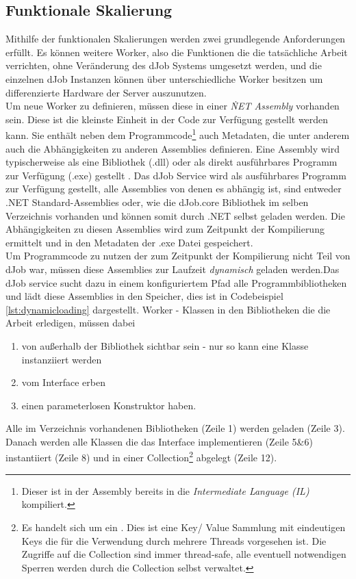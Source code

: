 \subsection{Funktionale Skalierung} \label{sec:dynload}
Mithilfe der funktionalen Skalierungen werden zwei grundlegende Anforderungen erfüllt. Es können weitere Worker, also die Funktionen die die tatsächliche Arbeit verrichten, ohne Veränderung des dJob Systems umgesetzt werden, und die einzelnen dJob Instanzen können über unterschiedliche Worker besitzen um differenzierte Hardware der Server auszunutzen.
\\Um neue Worker zu definieren, müssen diese in einer \emph{\.NET Assembly} vorhanden sein. 
Diese ist die kleinste Einheit in der Code zur Verfügung gestellt werden kann. Sie enthält neben dem Programmcode\footnote{Dieser ist in der Assembly bereits in die \emph{Intermediate Language (IL)} kompiliert.} auch Metadaten, die unter anderem auch die Abhängigkeiten zu anderen Assemblies definieren. Eine Assembly wird typischerweise als eine Bibliothek (.dll) oder als direkt ausführbares Programm zur Verfügung (.exe) gestellt \parencite[S. 17ff]{box}. Das dJob Service wird als ausführbares Programm zur Verfügung gestellt, alle Assemblies von denen es abhängig ist, sind entweder .NET Standard-Assemblies oder, wie die dJob.core Bibliothek im selben Verzeichnis vorhanden und können somit durch .NET selbst geladen werden. Die Abhängigkeiten zu diesen Assemblies wird zum Zeitpunkt der Kompilierung ermittelt und in den Metadaten der .exe Datei gespeichert.
\\Um Programmcode zu nutzen der zum Zeitpunkt der Kompilierung nicht Teil von dJob war, müssen diese Assemblies zur Laufzeit \emph{dynamisch} geladen werden.Das dJob service sucht dazu in einem konfiguriertem Pfad alle Programmbibliotheken und lädt diese Assemblies in den Speicher, dies ist in Codebeispiel \ref{lst:dynamicloading} dargestellt. 
Worker - Klassen in den Bibliotheken die die Arbeit erledigen, müssen dabei \begin{enumerate}
	\item von außerhalb der Bibliothek sichtbar sein - nur so kann eine Klasse instanziiert werden
	\item vom Interface  erben
	\item einen parameterlosen Konstruktor haben.
\end{enumerate}
Alle im Verzeichnis vorhandenen Bibliotheken (Zeile 1) werden geladen (Zeile 3). Danach werden alle Klassen die das Interface  implementieren (Zeile 5\&6) instantiiert (Zeile 8) und in einer Collection\footnote{Es handelt sich um ein . Dies ist eine Key/ Value Sammlung mit eindeutigen Keys die für die Verwendung durch mehrere Threads vorgesehen ist. Die Zugriffe auf die Collection sind immer thread-safe, alle eventuell notwendigen Sperren werden durch die Collection selbst verwaltet.} abgelegt (Zeile 12).
